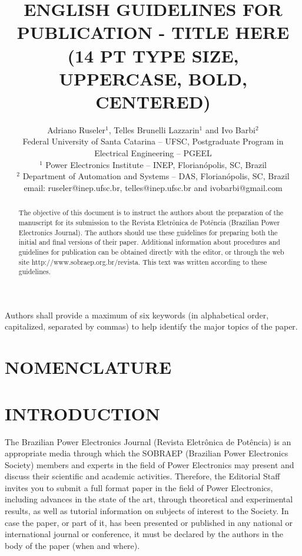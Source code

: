 \documentclass[english]{cobep-spec}
\title{ENGLISH GUIDELINES FOR PUBLICATION - TITLE HERE \\(14 PT TYPE SIZE, UPPERCASE, BOLD, CENTERED)}
\author{Adriano Ruseler$^{1}$, Telles Brunelli Lazzarin$^{1}$ and Ivo Barbi$^{2}$\\
	\normalsize Federal University of Santa Catarina -- UFSC, Postgraduate Program in Electrical Engineering -- PGEEL \\
	\normalsize $^{1}$ Power Electronics Institute -- INEP, Florianópolis, SC, Brazil\\
	\normalsize $^{2}$ Department of Automation and Systems -- DAS, Florianópolis, SC, Brazil\\
	\normalsize email: ruseler@inep.ufsc.br, telles@inep.ufsc.br and ivobarbi@gmail.com
}
\begin{document}
\maketitle

\begin{abstract}
	The objective of this document is to instruct the authors about the preparation of the manuscript for its submission to the Revista Eletrônica de Potência (Brazilian Power Electronics Journal). The authors should use these guidelines for preparing both the initial and final versions of their paper. Additional information about procedures and guidelines for publication can be obtained directly with the editor, or through the web site http://www.sobraep.org.br/revista. This text was written according to these guidelines.
\end{abstract}

\begin{keywords}
	Authors shall provide a maximum of six keywords (in alphabetical order, capitalized, separated by commas) to help identify the major topics of the paper.
\end{keywords}


\section*{NOMENCLATURE}




\section{INTRODUCTION}

The Brazilian Power Electronics Journal (Revista Eletrônica de Potência) is an appropriate media through which the SOBRAEP (Brazilian Power Electronics Society) members and experts in the field of Power Electronics may present and discuss their scientific and academic activities. Therefore, the Editorial Staff invites you to submit a full format paper in the field of Power Electronics, including advances in the state of the art, through theoretical and experimental results, as well as tutorial information on subjects of interest to the Society. In case the paper, or part of it, has been presented or published in any national or international journal or conference, it must be declared by the authors in the body of the paper (when and where). 
\end{document}
